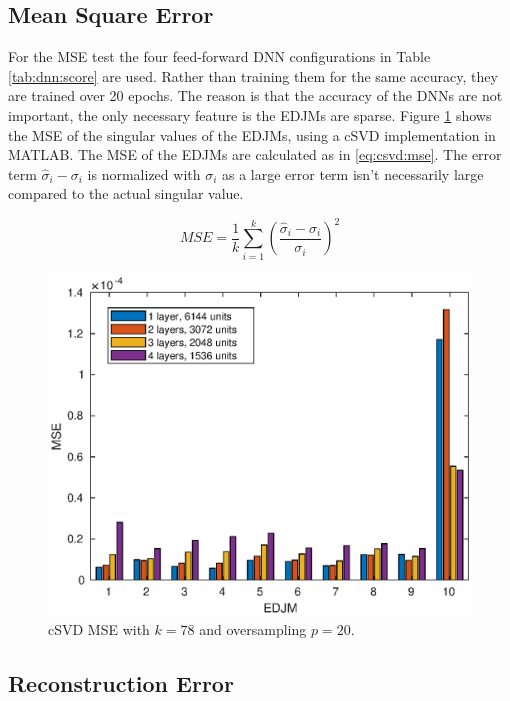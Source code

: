\subsection*{Mean Square Error}

For the MSE test the four feed-forward DNN configurations in Table \ref{tab:dnn:score} are used. Rather than training them for the same accuracy, they are trained over 20 epochs. The reason is that the accuracy of the DNNs are not important, the only necessary feature is the EDJMs are sparse. Figure \ref{fig:csvd:mse} shows the MSE of the singular values of the EDJMs, using a cSVD implementation in MATLAB. The MSE of the EDJMs are calculated as in \eqref{eq:csvd:mse}. The error term $\hat \sigma_i - \sigma_i$ is normalized with $\sigma_i$ as a large error term isn't necessarily large compared to the actual singular value. 

\begin{equation}
  \label{eq:csvd:mse}
    MSE = \frac{1}{k} \sum_{i=1}^{k} \left ( \frac{\hat \sigma_i - \sigma_i}{\sigma_i} \right )^2
\end{equation}
  
\begin{figure}[H]
  \centering
  \includegraphics[scale=0.6]{Figures/csvd_mse.eps}
  \caption{cSVD MSE with $k=78$ and oversampling $p=20$.}
  \label{fig:csvd:mse}
\end{figure}

\subsection*{Reconstruction Error}

